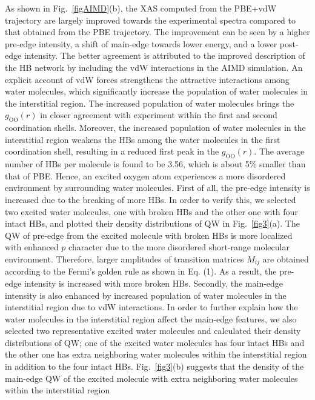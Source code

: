 \documentclass[prb,twocolumn,showpacs,preprintnumbers,superscriptaddress,amsmath,amssymb]{revtex4}
\begin{document}
As shown in Fig.~\ref{figAIMD}(b), the XAS computed from the PBE+vdW trajectory are largely improved towards the experimental spectra compared to that obtained from the PBE trajectory.
The improvement can be seen by a higher pre-edge intensity, a shift of main-edge towards lower energy, and a lower post-edge intensity.
The better agreement is attributed to the improved description of the HB network by including the vdW interactions in the AIMD simulation.
An explicit account of vdW forces strengthens the attractive interactions among water molecules,
which significantly increase the population of water molecules in the interstitial region.
The increased population of water molecules brings the $g_{\mathrm{OO}}(r)$ in closer agreement with experiment
within the first and second coordination shells.
Moreover, the increased population of water molecules in the interstitial region weakens the HBs among the water molecules in the first
coordination shell, resulting in a reduced first peak in the $g_{\mathrm{OO}}(r)$.
The average number of HBs per molecule is found to be 3.56, which is about 5\% smaller than that of PBE.
Hence, an excited oxygen atom experiences a more disordered environment by surrounding water molecules.
First of all, the pre-edge intensity is increased due to the breaking of more HBs.
In order to verify this, we selected two excited water molecules, one with broken HBs and the other one with four intact HBs,
and plotted their density distributions of QW in Fig.~\ref{fig3}(a).
The QW of pre-edge from the excited molecule with broken HBs is more localized with enhanced $p$ character
due to the more disordered short-range molecular environment.
Therefore, larger amplitudes of transition matrices $M_{ij}$ are obtained according to
the Fermi's golden rule as shown in Eq. (1).
As a result, the pre-edge intensity is increased with more broken HBs.
Secondly, the main-edge intensity is also enhanced by increased population of water molecules in the interstitial region
due to vdW interactions.
In order to further explain how the water molecules in the interstitial region affect the main-edge features,
we also selected two representative excited water molecules and calculated their density distributions of QW;
one of the excited water molecules has four intact HBs and
the other one has extra neighboring water molecules
within the interstitial region in addition to the four intact HBs.
Fig.~\ref{fig3}(b) suggests that the density of the main-edge QW of the excited molecule with
extra neighboring water molecules within the interstitial region
\end{document}
